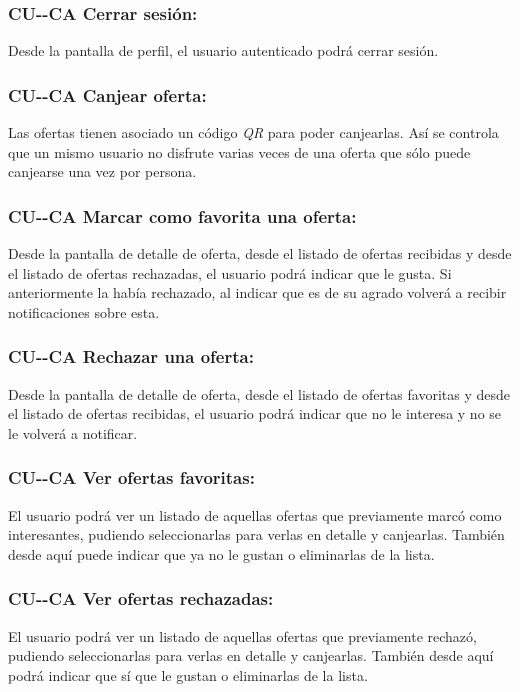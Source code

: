 \subsubsection*{CU-\theUseCase-CA Cerrar sesión:}
Desde la pantalla de perfil, el usuario autenticado podrá cerrar sesión.
\subsubsection*{CU-\theUseCase-CA Canjear oferta:} Las ofertas tienen asociado un código \textit{QR} para poder canjearlas. Así se controla que un mismo usuario no disfrute varias veces de una oferta que sólo puede canjearse una vez por persona.
\subsubsection*{CU-\theUseCase-CA Marcar como favorita una oferta:} Desde la pantalla de detalle de oferta, desde el listado de ofertas recibidas y desde el listado de ofertas rechazadas, el usuario podrá indicar que le gusta. Si anteriormente la había rechazado, al indicar que es de su agrado volverá a recibir notificaciones sobre esta.
\subsubsection*{CU-\theUseCase-CA Rechazar una oferta:} Desde la pantalla de detalle de oferta, desde el listado de ofertas favoritas y desde el listado de ofertas recibidas, el usuario podrá indicar que no le interesa y no se le volverá a notificar.
\subsubsection*{CU-\theUseCase-CA Ver ofertas favoritas:} El usuario podrá ver un listado de aquellas ofertas que previamente marcó como interesantes, pudiendo seleccionarlas para verlas en detalle y canjearlas. También desde aquí puede indicar que ya no le gustan o eliminarlas de la lista.
\subsubsection*{CU-\theUseCase-CA Ver ofertas rechazadas:} El usuario podrá ver un listado de aquellas ofertas que previamente rechazó, pudiendo seleccionarlas para verlas en detalle y canjearlas. También desde aquí podrá indicar que sí que le gustan o eliminarlas de la lista.
